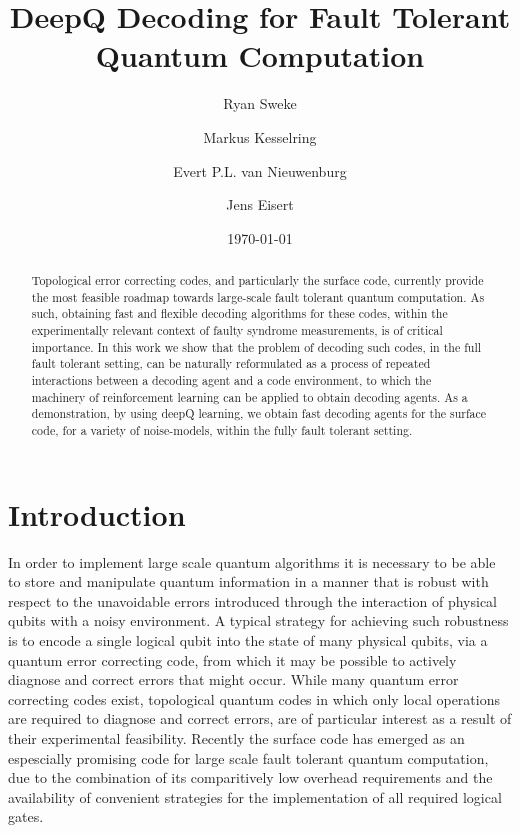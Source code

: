\documentclass[onecolumn,preprintnumbers,amsmath,amssymb,notitlepage,nofootinbib,longbibliography,superscriptaddress]{revtex4-1}
\begin{document}
\title{DeepQ Decoding for Fault Tolerant Quantum Computation}

\author{Ryan Sweke}
\author{Markus Kesselring}
\author{Evert P.L. van Nieuwenburg}
\author{Jens Eisert}


\date{\today}


\begin{abstract}
Topological error correcting codes, and particularly the surface code, currently provide the most feasible roadmap towards large-scale fault tolerant quantum computation. As such, obtaining fast and flexible decoding algorithms for these codes, within the experimentally relevant context of faulty syndrome measurements, is of critical importance. In this work we show that the problem of decoding such codes, in the full fault tolerant setting, can be naturally reformulated as a process of repeated interactions between a decoding agent and a code environment, to which the machinery of reinforcement learning can be applied to obtain decoding agents. As a demonstration, by using deepQ learning, we obtain fast decoding agents for the surface code, for a variety of noise-models, within the fully fault tolerant setting.
\end{abstract}

\maketitle
 
 
\section{Introduction}\label{s:introduction}

    In order to implement large scale quantum algorithms it is necessary to be able to store and manipulate quantum information in a manner that is robust with respect to the unavoidable errors introduced through the interaction of physical qubits with a noisy environment. A typical strategy for achieving such robustness is to encode a single logical qubit into the state of many physical qubits, via a quantum error correcting code, from which it may be possible to actively diagnose and correct errors that might occur. While many quantum error correcting codes exist, topological quantum codes in which only local operations are required to diagnose and correct errors, are of particular interest as a result of their experimental feasibility. Recently the surface code has emerged as an espescially promising code for large scale fault tolerant quantum computation, due to the combination of its comparitively low overhead requirements and the availability of convenient strategies for the implementation of all required logical gates.
\end{document}
